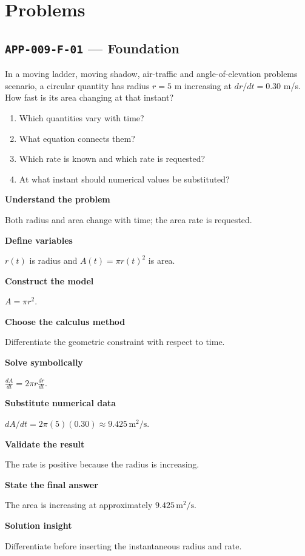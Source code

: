 \documentclass[11pt]{book}
\newcommand{\pid}[1]{\texttt{#1}}
\begin{document}
\section*{Problems}
\subsection*{\pid{APP-009-F-01} — Foundation}
\begin{problembox}
In a moving ladder, moving shadow, air-traffic and angle-of-elevation problems scenario, a circular quantity has radius $r=5$ m increasing at $dr/dt=0.30$ m/s. How fast is its area changing at that instant?
\end{problembox}
\begin{promptbox}\begin{enumerate}
\item Which quantities vary with time?
\item What equation connects them?
\item Which rate is known and which rate is requested?
\item At what instant should numerical values be substituted?
\end{enumerate}\end{promptbox}
\begin{solutionbox}
\textbf{Understand the problem}\par Both radius and area change with time; the area rate is requested.\par\medskip
\textbf{Define variables}\par $r(t)$ is radius and $A(t)=\pi r(t)^2$ is area.\par\medskip
\textbf{Construct the model}\par $A=\pi r^2$.\par\medskip
\textbf{Choose the calculus method}\par Differentiate the geometric constraint with respect to time.\par\medskip
\textbf{Solve symbolically}\par $\frac{dA}{dt}=2\pi r\frac{dr}{dt}$.\par\medskip
\textbf{Substitute numerical data}\par $dA/dt=2\pi(5)(0.30)\approx 9.425\,\mathrm{m^2/s}$.\par\medskip
\textbf{Validate the result}\par The rate is positive because the radius is increasing.\par\medskip
\textbf{State the final answer}\par The area is increasing at approximately $9.425\,\mathrm{m^2/s}$.\par\medskip
\textbf{Solution insight}\par Differentiate before inserting the instantaneous radius and rate.\par\medskip
\end{solutionbox}
\end{document}
